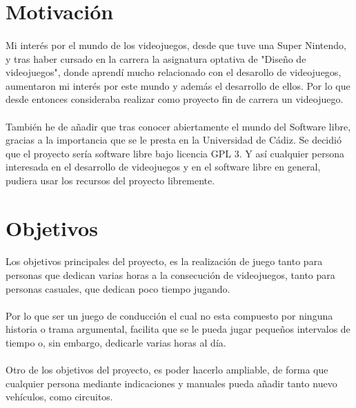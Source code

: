 \section{Motivación}

\paragraph{}
Mi interés por el mundo de los videojuegos, desde que tuve una Super Nintendo, y tras haber cursado en la carrera
la asignatura optativa de "Diseño de videojuegos", donde aprendí mucho relacionado con el desarollo de videojuegos,
aumentaron mi interés por este mundo y además el desarrollo de ellos. Por lo que desde entonces consideraba realizar 
como proyecto fin de carrera un videojuego.

\paragraph{}
También he de añadir que tras conocer abiertamente el mundo del Software libre, gracias a la importancia que se le presta
en la Universidad de Cádiz. Se decidió que el proyecto sería software libre bajo licencia GPL 3. Y así cualquier persona
interesada en el desarrollo de videojuegos y en el software libre en general, pudiera usar los recursos del proyecto
libremente.

\section{Objetivos}

\paragraph{}
Los objetivos principales del proyecto, es la realización de juego tanto para personas que
dedican varias horas a la consecución de videojuegos, tanto para personas casuales, que dedican poco tiempo
jugando.

\paragraph{}
Por lo que ser un juego de conducción el cual no esta compuesto por ninguna historia o trama argumental, facilita que se le pueda
jugar pequeños intervalos de tiempo o, sin embargo, dedicarle varias horas al día.

\paragraph{}
Otro de los objetivos del proyecto, es poder hacerlo ampliable, de forma que cualquier persona mediante indicaciones y manuales
pueda añadir tanto nuevo vehículos, como circuitos.

